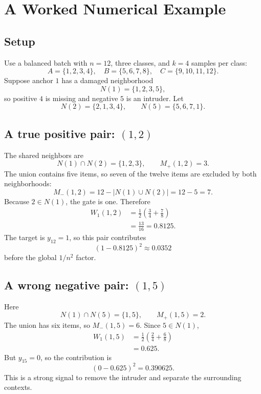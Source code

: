 \documentclass[11pt,oneside,openany]{book}
\theoremstyle{myplain}
\theoremstyle{definition}
\newcommand{\card}[1]{\left|#1\right|}
\begin{document}
\chapter{A Worked Numerical Example}
\label{chap:worked}

\section{Setup}

Use a balanced batch with $n=12$, three classes, and $k=4$ samples per class:
\[
A=\{1,2,3,4\},\quad B=\{5,6,7,8\},\quad C=\{9,10,11,12\}.
\]
Suppose anchor $1$ has a damaged neighborhood
\[
N(1)=\{1,2,3,5\},
\]
so positive $4$ is missing and negative $5$ is an intruder. Let
\[
N(2)=\{2,1,3,4\},\qquad N(5)=\{5,6,7,1\}.
\]

\section{A true positive pair: $(1,2)$}

The shared neighbors are
\[
N(1)\cap N(2)=\{1,2,3\},\qquad M_+(1,2)=3.
\]
The union contains five items, so seven of the twelve items are excluded by both neighborhoods:
\[
M_-(1,2)=12-\card{N(1)\cup N(2)}=12-5=7.
\]
Because $2\in N(1)$, the gate is one. Therefore
\begin{align}
W_1(1,2)
&=\frac12\left(\frac34+\frac78\right)\\
&=\frac{13}{16}=0.8125.
\end{align}
The target is $y_{12}=1$, so this pair contributes
\[
(1-0.8125)^2\approx0.0352
\]
before the global $1/n^2$ factor.

\section{A wrong negative pair: $(1,5)$}

Here
\[
N(1)\cap N(5)=\{1,5\},\qquad M_+(1,5)=2.
\]
The union has six items, so $M_-(1,5)=6$. Since $5\in N(1)$,
\begin{align}
W_1(1,5)
&=\frac12\left(\frac24+\frac68\right)\\
&=0.625.
\end{align}
But $y_{15}=0$, so the contribution is
\[
(0-0.625)^2=0.390625.
\]
This is a strong signal to remove the intruder and separate the surrounding contexts.
\end{document}
